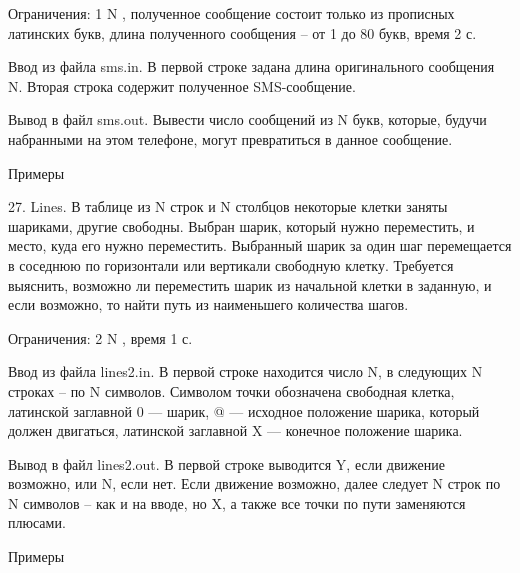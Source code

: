 \documentclass[]{article}
\begin{document}
Ограничения: 1 \leq N , полученное сообщение состоит только из прописных латинских букв, длина полученного сообщения – от 1 до 80 букв, время 2 с.

Ввод из файла sms.in. В первой строке задана длина оригинального сообщения N. Вторая строка содержит полученное SMS-сообщение.

Вывод в файл sms.out. Вывести число сообщений из N букв, которые, будучи набранными на этом телефоне, могут превратиться в данное сообщение.

Примеры



27. Lines. В таблице из N строк и N столбцов некоторые клетки заняты шариками, другие свободны. Выбран шарик, который нужно переместить, и место, куда его нужно переместить. Выбранный шарик за один шаг перемещается в соседнюю по горизонтали или вертикали свободную клетку. Требуется выяснить, возможно ли переместить шарик из начальной клетки в заданную, и если возможно, то найти путь из наименьшего количества шагов.

Ограничения: 2 \leq N , время 1 с.

Ввод из файла lines2.in. В первой строке находится число N, в следующих N строках – по N символов. Символом точки обозначена свободная клетка, латинской заглавной 0 — шарик, @ — исходное положение шарика, который должен двигаться, латинской заглавной X — конечное положение шарика.

Вывод в файл lines2.out. В первой строке выводится Y, если движение возможно, или N, если нет. Если движение возможно, далее следует N строк по N символов – как и на вводе, но X, а также все точки по пути заменяются плюсами.

Примеры
\end{document}

